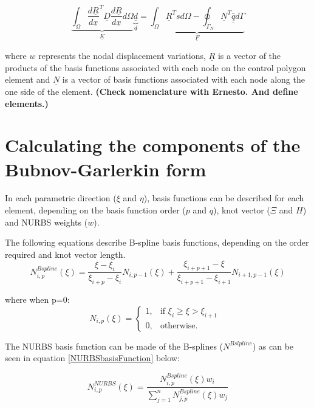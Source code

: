 \documentclass[a4paper]{report}
\begin{document}
	\begin{equation}
		\underbrace{\int_{\Omega} \frac{d\underline{R}}{d\underline{x}}^T \underline{D} \frac{d\underline{R}}{d\underline{x}} d\Omega}_{\underline{K}} \underbrace{\underline{d}}_{\underline{d}} = \underbrace{\int_{\Omega} \underline{R}^T s d\Omega - \oint_{\Gamma_N} \underline{N}^T \bar{\underline{q}} d\Gamma }_{\underline{F}}
		\label{2DscalarBGF}
	\end{equation}
	
	\noindent where $w$ represents the nodal displacement variations, $\underline{R}$ is a vector of the products of the basis functions associated with each node on the control polygon element and $\underline{N}$ is a vector of basis functions associated with each node along the one side of the element. \textbf{(Check nomenclature with Ernesto. And define elements.)}


\section{Calculating the components of the Bubnov-Garlerkin form}

	In each parametric direction ($\xi$ and $\eta$), basis functions can be described for each element, depending on the basis function order ($p$ and $q$), knot vector ($\Xi$ and $H$) and NURBS weights ($w$).
	
	\noindent The following equations describe B-spline basis functions, depending on the order required and knot vector length. 
	\begin{equation}
		N^{Bspline}_{i,p}(\xi)=\frac{\xi - \xi_i}{\xi_{i+p}-\xi_i}N_{i,p-1}(\xi)+\frac{\xi_{i+p+1} - \xi}{\xi_{i+p+1}-\xi_{i+1}}N_{i+1,p-1}(\xi)
	\end{equation}
	
	where when p=0:
	\begin{equation}
		N_{i,p}(\xi)=\begin{cases}
		1, & \text{if $\xi_i \geq \xi > \xi_{i+1}$ } \\
		0, & \text{otherwise}.
		\end{cases}
	\end{equation}
	
	\noindent The NURBS basis function can be made of the B-splines ($N^{Bslpline}$) as can be seen in equation \ref{NURBSbasisFunction} below:
	
	\begin{equation}
		N^{NURBS}_{i,p}(\xi)=\frac{N^{Bspline}_{i,p}(\xi)w_i}{\sum_{j=1}^{n}N^{Bspline}_{j,p}(\xi)w_j}
		\label{NURBSbasisFunction}
	\end{equation}
	
\end{document}
